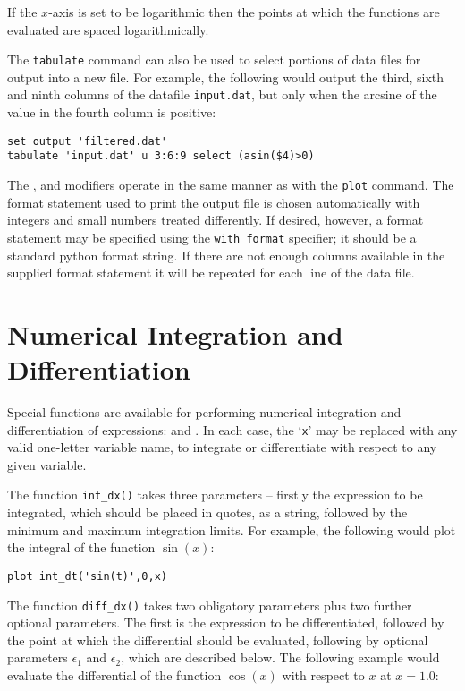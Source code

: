\noindent If the $x$-axis is set to be logarithmic then the points at which the
functions are evaluated are spaced logarithmically.

The {\tt tabulate} command can also be used to select portions of data files
for output into a new file.  For example, the following would output the third,
sixth and ninth columns of the datafile {\tt input.dat}, but only when the
arcsine of the value in the fourth column is positive:

\begin{verbatim}
set output 'filtered.dat'
tabulate 'input.dat' u 3:6:9 select (asin($4)>0)
\end{verbatim}

\noindent The ,  and  modifiers
operate in the same manner as with the {\tt plot} command.  The format
statement used to print the output file is chosen automatically with integers
and small numbers treated differently.  If desired, however, a format statement
may be specified using the {\tt with format} specifier; it should be a standard
python format string.  If there are not enough columns available in the
supplied format statement it will be repeated for each line of the data file.

\section{Numerical Integration and Differentiation}

 Special functions are available for
performing numerical integration and differentiation of expressions:
 and . In each case, the `{\tt x}' may
be replaced with any valid one-letter variable name, to integrate or
differentiate with respect to any given variable.

The function {\tt int\_dx()} takes three parameters -- firstly the
expression to be integrated, which should be placed in quotes, as a string,
followed by the minimum and maximum integration limits. For example, the
following would plot the integral of the function $\sin(x)$:

\begin{verbatim}
plot int_dt('sin(t)',0,x)
\end{verbatim} 

The function {\tt diff\_dx()} takes two obligatory parameters plus two
further optional parameters. The first is the expression to be differentiated,
followed by the point at which the differential should be evaluated, following
by optional parameters $\epsilon_1$ and $\epsilon_2$, which are described
below.  The following example would evaluate the differential of the function
$\cos(x)$ with respect to $x$ at $x=1.0$:

